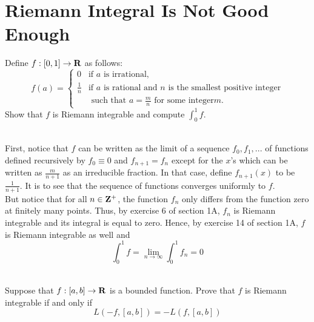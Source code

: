 \section{Riemann Integral Is Not Good Enough}

\begin{exercise}
    Define $f : [0, 1] \to \mathbf{R}$ as follows:
    $$f(a) = \begin{cases}
        0 & \text{if }a\text{ is irrational}, \\
        \frac{1}{n} & \text{if }a\text{ is rational and }n\text{ is the smallest positive integer} \\ &\text{ such that }a=\frac{m}{n}\text{ for some integer}m.
    \end{cases}$$
    Show that $f$ is Riemann integrable and compute $\int_{0}^{1}f.$ \\
\end{exercise}

\begin{solution}
    \\ First, notice that $f$ can be written as the limit of a sequence $f_0, f_1, ...$ of functions defined recursively by $f_0 \equiv 0$ and $f_{n+1} = f_n$ except for the $x$'s which can be written as $\frac{m}{n+1}$ as an irreducible fraction. In that case, define $f_{n+1}(x)$ to be $\frac{1}{n+1}$. It is to see that the sequence of functions converges uniformly to $f$. \\ 
    But notice that for all $n \in \mathbf{Z}^+$, the function $f_n$ only differs from the function zero at finitely many points. Thus, by exercise 6 of section 1A, $f_n$ is Riemann integrable and its integral is equal to zero. Hence, by exercise 14 of section 1A, $f$ is Riemann integrable as well and 
    $$\int_{0}^{1}f = \lim_{n \rightarrow \infty}\int_{0}^{1}f_n = 0$$\\
\end{solution}

\begin{exercise}
    Suppose that $f : [a,b] \to \mathbf{R}$ is a bounded function. Prove that $f$ is Riemann integrable if and only if 
    $$L(-f, [a,b]) = -L(f, [a,b])$$
\end{exercise}

